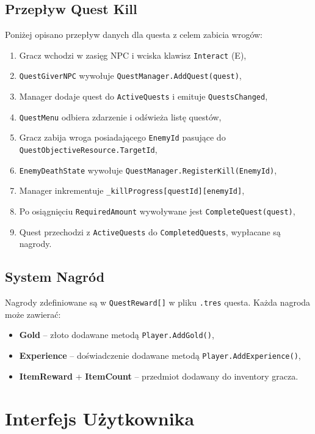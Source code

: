 \subsection{Przepływ Quest Kill}

Poniżej opisano przepływ danych dla questa z celem zabicia wrogów:

\begin{enumerate}
    \item Gracz wchodzi w zasięg NPC i wciska klawisz \texttt{Interact} (E),
    \item \texttt{QuestGiverNPC} wywołuje \texttt{QuestManager.AddQuest(quest)},
    \item Manager dodaje quest do \texttt{ActiveQuests} i emituje \texttt{QuestsChanged},
    \item \texttt{QuestMenu} odbiera zdarzenie i odświeża listę questów,
    \item Gracz zabija wroga posiadającego \texttt{EnemyId} pasujące do \texttt{QuestObjectiveResource.TargetId},
    \item \texttt{EnemyDeathState} wywołuje \texttt{QuestManager.RegisterKill(EnemyId)},
    \item Manager inkrementuje \texttt{\_killProgress[questId][enemyId]},
    \item Po osiągnięciu \texttt{RequiredAmount} wywoływane jest \texttt{CompleteQuest(quest)},
    \item Quest przechodzi z \texttt{ActiveQuests} do \texttt{CompletedQuests}, wypłacane są nagrody.
\end{enumerate}

\subsection{System Nagród}

Nagrody zdefiniowane są w \texttt{QuestReward[]} w pliku \texttt{.tres} questa. Każda nagroda może zawierać:
\begin{itemize}
    \item \textbf{Gold} – złoto dodawane metodą \texttt{Player.AddGold()},
    \item \textbf{Experience} – doświadczenie dodawane metodą \texttt{Player.AddExperience()},
    \item \textbf{ItemReward} + \textbf{ItemCount} – przedmiot dodawany do inventory gracza.
\end{itemize}

\section{Interfejs Użytkownika}

